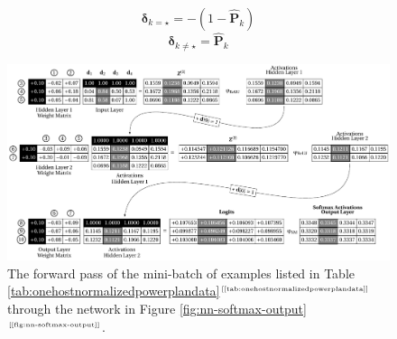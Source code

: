 \documentclass[xcolor={table}]{beamer}
\newcommand{\ourRef}[1]{\ref{#1}$^{\text{\tiny[\pageref{#1}]}}$}
\begin{document}
 \begin{frame} 
\begin{equation}
\boldsymbol{\delta}_{k=\star}=- \left(1-\mathbf{\hat{P}}_k \right)
\label{eq:catdeltastar}
\end{equation}
\begin{equation}
\boldsymbol{\delta}_{k\neq\star}= \mathbf{\hat{P}}_k
\label{eq:catdeltaNOTstar}
\end{equation}
\end{frame} 



 \begin{frame} 
\begin{figure}
\includegraphics[width=\textwidth]{./images/fmlpda_8_28.pdf}
\caption{The forward pass of the mini-batch of examples listed in Table \ourRef{tab:onehostnormalizedpowerplandata} through the network in Figure \ourRef{fig:nn-softmax-output}.}
\label{fig:ReluCatForwardPass}
\end{figure}
\end{frame} 
\end{document}

